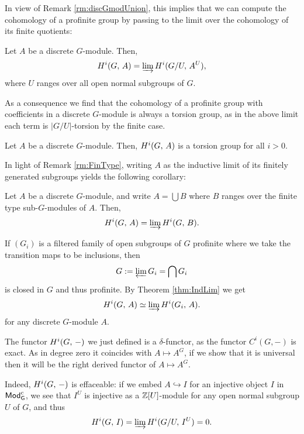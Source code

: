 \documentclass[a4paper, oneside]{memoir}
\begin{document}
In view of Remark \ref{rm:discGmodUnion}, this implies that we can compute the cohomology of a profinite group by passing to the limit over the cohomology of its finite quotients:
\begin{corollary}\label{cor:ModLim}
	Let $A$ be a discrete $G$-module. Then,
	\[
		H^{i}( G, \, A )=\varinjlim{H^{i}( G/U, \, A^U )},
	\]
	where $U$ ranges over all open normal subgroups of $G$.
\end{corollary}

As a consequence we find that the cohomology of a profinite group with coefficients in a discrete $G$-module is always a torsion group, as in the above limit each term is $|G/U|$-torsion by the finite case.

\begin{corollary}
	Let $A$ be a discrete $G$-module. Then, $H^{i}( G, \, A )$ is a torsion group for all $i>0$.
\end{corollary}

In light of Remark \ref{rm:FinType}, writing $A$ as the inductive limit of its finitely generated subgroups yields the following corollary:

\begin{corollary}
	Let $A$ be a discrete $G$-module, and write $A=\bigcup{B}$ where $B$ ranges over the finite type sub-$G$-modules of $A$. Then,
	\[
		H^{i}( G, \, A )=\varinjlim{H^{i}( G, \, B )}.
	\]
\end{corollary}

\begin{example}\label{ex:IntOpenSgr}
	If $(G_i)$ is a filtered family of open subgroups of $G$ profinite where we take the transition maps to be inclusions, then
	\[
		G:=\varprojlim{G_i}=\bigcap{G_i}
	\]
	is closed in $G$ and thus profinite.
	By Theorem \ref{thm:IndLim} we get
	\[
		H^{i}( G, \, A )\simeq \varinjlim{H^{i}( G_i, \, A )}.
	\]
	for any discrete $G$-module $A$.
\end{example}

\begin{remark}
	The functor $H^{i}( G, \, - )$ we just defined is a $\delta$-functor, as the functor $C^i{(G,-)}$ is exact. As in degree zero it coincides with $A\mapsto A^G$, if we show that it is universal then it will be the right derived functor of $A\mapsto A^G$.

	Indeed, $H^{i}( G, \, - )$ is effaceable: if we embed $A\hookrightarrow I$ for an injective object $I$ in $\mathsf{Mod}_\mathsf{G}^{c}$, we see that $I^U$ is injective as a $\mathbb{Z}[U]$-module for any open normal subgroup $U$ of $G$, and thus
	\[
		H^{i}( G, \, I )=\varinjlim{H^{i}( G/U, \, I^U )}=0.
	\]
\end{remark}
\end{document}
